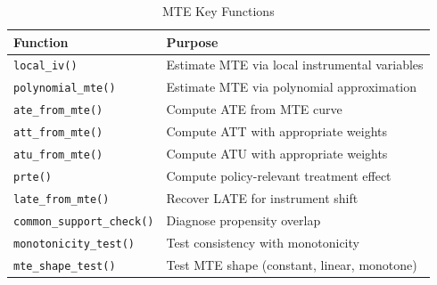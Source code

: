 \begin{table}[htbp]
\centering
\caption{MTE Key Functions}
\label{tab:mte-functions}
\begin{tabular}{ll}
\toprule
Function & Purpose \\
\midrule
\texttt{local\_iv()} & Estimate MTE via local instrumental variables \\
\texttt{polynomial\_mte()} & Estimate MTE via polynomial approximation \\
\texttt{ate\_from\_mte()} & Compute ATE from MTE curve \\
\texttt{att\_from\_mte()} & Compute ATT with appropriate weights \\
\texttt{atu\_from\_mte()} & Compute ATU with appropriate weights \\
\texttt{prte()} & Compute policy-relevant treatment effect \\
\texttt{late\_from\_mte()} & Recover LATE for instrument shift \\
\texttt{common\_support\_check()} & Diagnose propensity overlap \\
\texttt{monotonicity\_test()} & Test consistency with monotonicity \\
\texttt{mte\_shape\_test()} & Test MTE shape (constant, linear, monotone) \\
\bottomrule
\end{tabular}
\end{table}
